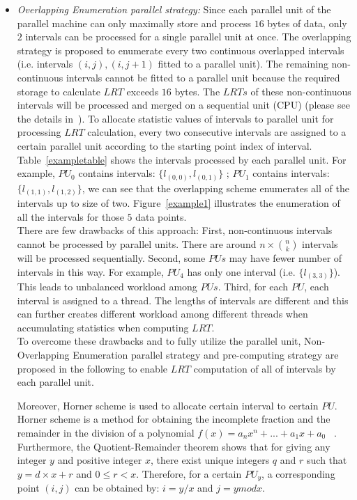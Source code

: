 \documentclass[AMA,LATO1COL]{WileyNJD-v2}
\begin{document}
 \begin{itemize}
 \item \emph{Overlapping Enumeration parallel strategy:}
Since each parallel unit of the parallel machine can only maximally store and process $16$ bytes of data, only $2$ intervals can be processed for a single parallel unit at once. The overlapping strategy is proposed to enumerate every two continuous overlapped intervals (i.e. intervals $(i,j),(i,j+1)$ fitted to a parallel unit). The remaining non-continuous intervals cannot be fitted to a parallel unit because the required storage to calculate $LRT$ exceeds $16$ bytes. The $LRTs$ of these non-continuous intervals will be processed and merged on a sequential unit (CPU) (please see the details in~\cite{apweb}). To allocate statistic values of intervals to parallel unit for processing $LRT$ calculation, every two consecutive intervals are assigned to a certain parallel unit according to the starting point index of interval. Table~\ref{exampletable} shows the intervals processed by each parallel unit. For example, $PU_0$ contains intervals: $\{l_{(0,0)},l_{(0,1)}\}$ ; $PU_1$ contains intervals: $\{l_{(1,1)},l_{(1,2)}\}$, we can see that the overlapping scheme enumerates all of the intervals up to size of two. Figure~\ref{example1} illustrates the enumeration of all the intervals for those $5$ data points. \\

There are few drawbacks of this approach: First,  non-continuous intervals cannot be processed by parallel units. There are around $n\times {n \choose k}$ intervals will be processed sequentially. Second, some $PUs$ may have fewer number of intervals in this way. For example, $PU_4$ has only one interval (i.e. $\{l_{(3,3)}\}$). This leads to unbalanced workload among $PUs$.  Third, for each $PU$, each interval is assigned to a thread. The lengths of intervals are different and this can further creates different workload among different threads when accumulating statistics when computing $LRT$.\\

To overcome these drawbacks and to fully utilize the parallel unit, Non-Overlapping Enumeration parallel strategy and pre-computing strategy are proposed in the following to enable $LRT$ computation of all of intervals by each parallel unit.

Moreover, Horner scheme is used to allocate certain interval to certain $PU$. Horner scheme is a method for obtaining the incomplete fraction and the remainder in the division of a polynomial $f(x)= a_nx^n+ ...+ a_1x+ a_0$ ~\cite{horner}. Furthermore, the Quotient-Remainder theorem shows that for giving any integer $y$ and positive integer $x$, there exist unique integers $q$ and $r$ such that $y=d\times x+r$ and $0\leq r < x$. Therefore, for a certain $PU_y$, a corresponding point $(i,j)$ can be obtained by: $i= y /x$ and $j=y mod x$.


\end{itemize}
\end{document}
